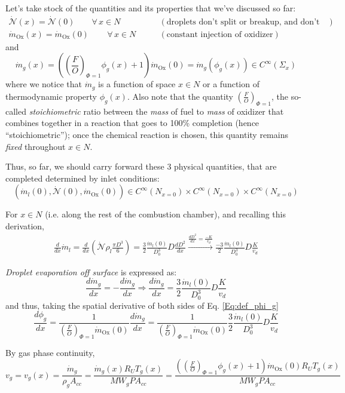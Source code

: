 \documentclass[10pt]{amsart}
\begin{document}
\begin{multicols*}{2}
Let's take stock of the quantities and its properties that we've discussed so far:
\[
\begin{aligned}
  \dot{\mathcal{N}}(x) = \dot{\mathcal{N}}(0) \qquad \forall \, x \in N & \qquad (\text{droplets don't split or breakup, and don't combine together}) \\ 
  \dot{m}_{\text{Ox}}(x) = \dot{m}_{\text{Ox}}(0) \qquad \, \forall \, x \in N & \qquad (\text{constant injection of oxidizer}) 
\end{aligned}
\]
and 
\[
\dot{m}_g(x) = \left( \left( \frac{F}{O} \right)_{\Phi =1} \phi_g(x) + 1 \right) \dot{m}_{\text{Ox} }(0) = \dot{m}_g(\phi_g(x)) \in C^{\infty}(\Sigma_x) 
\]
where we notice that $\dot{m}_g$ is a function of space $x\in N$ or a function of thermodynamic property $\phi_g(x)$.  Also note that the quantity $\left( \frac{F}{O} \right)_{\Phi=1}$, the so-called \emph{stoichiometric} ratio between the \emph{mass} of fuel to \emph{mass} of oxidizer that combines together in a reaction that goes to 100\% completion (hence ``stoichiometric''); once the chemical reaction is chosen, this quantity remains \emph{fixed} throughout $x\in N$.  

Thus, so far, we should carry forward these 3 physical quantities, that are completed determined by inlet conditions:
\[
(\dot{m}_l(0), \dot{\mathcal{N}}(0), \dot{m}_{\text{Ox}}(0) ) \in C^{\infty}(N_{x=0}) \times C^{\infty}(N_{x=0}) \times C^{\infty}(N_{x=0})
\]

For $x\in N$ (i.e. along the rest of the combustion chamber), and recalling this derivation,
\[
\begin{gathered}
  \frac{d}{dx} \dot{m}_l = \frac{d}{dx} ( \dot{\mathcal{N}} \rho_l \frac{\pi D^3}{6} ) = \frac{3}{2}\frac{\dot{m}_l(0) }{ D_0^3} D \frac{dD^2}{dx} \xrightarrow{ \frac{dD^2}{dx} = \frac{-K}{v_d} } \frac{-3}{2} \frac{\dot{m}_l(0) }{ D_0^3} D \frac{K}{v_d}
\end{gathered}
\]

\emph{Droplet evaporation off surface} is expressed as:
\[
\frac{d \dot{m}_g}{dx} = -\frac{d\dot{m}_g}{dx} \Longrightarrow \frac{d\dot{m}_g}{dx} = \frac{3}{2} \frac{\dot{m}_l(0) }{ D_0^3} D \frac{K}{v_d}
\]
and thus, taking the spatial derivative of both sides of Eq. \ref{Eq:def_phi_g}
\[
\frac{d\phi_g}{dx} = \frac{1}{ \left( \frac{F}{O} \right)_{ \Phi =1} \dot{m}_{\text{Ox}}(0) } \frac{d\dot{m}_g}{dx} = \frac{1}{ \left( \frac{F}{O} \right)_{\Phi =1} \dot{m}_{\text{Ox}}(0) } \frac{3}{2}\frac{\dot{m}_l(0) }{ D_0^3} D \frac{K}{v_d}
\]

By gas phase continuity,
\[
v_g = v_g(x) = \frac{\dot{m}_g}{\rho_g A_{cc}} = \frac{\dot{m}_g(x) R_U T_g(x) }{ MW_g P A_{cc}} = \frac{ \left( \left( \frac{F}{O} \right)_{\Phi =1} \phi_g(x) + 1 \right) \dot{m}_{\text{Ox}}(0) R_U T_g(x) }{ MW_g P A_{cc}}
\]


\end{multicols*}
\end{document}

